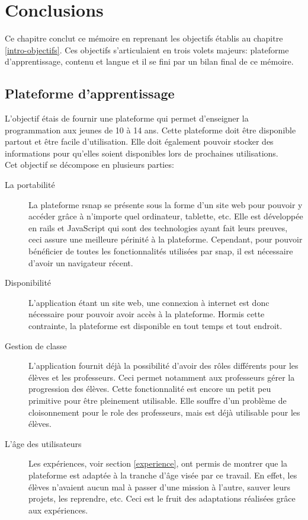 ﻿\chapter{Conclusions}
Ce chapitre conclut ce mémoire en reprenant les objectifs établis au chapitre \ref{intro-objectifs}. Ces objectifs s'articulaient en trois volets majeurs: plateforme d'apprentissage, contenu et langue et il se fini par un bilan final de ce mémoire.
\section{Plateforme d'apprentissage}
L'objectif étais de fournir une plateforme qui permet d'enseigner la programmation aux jeunes de 10 à 14 ans. Cette plateforme doit être disponible partout et être facile d'utilisation. Elle doit également pouvoir stocker des informations pour qu'elles soient disponibles lors de prochaines utilisations.\\

Cet objectif se décompose en plusieurs parties:
\begin{description}
  \item[La portabilité] La plateforme \gls{rsnap} se présente sous la forme d'un site web \cite{rsnap} pour pouvoir y accéder grâce à n'importe quel ordinateur, tablette, etc. Elle est développée en \gls{rails} et JavaScript qui sont des technologies ayant fait leurs preuves, ceci assure une meilleure périnité à la plateforme. Cependant, pour pouvoir bénéficier de toutes les fonctionnalités utilisées par \gls{snap}, il est nécessaire d'avoir un navigateur récent.

  \item[Disponibilité] L'application étant un site web, une connexion à internet est donc nécessaire pour pouvoir avoir accès à la plateforme. Hormis cette contrainte, la plateforme est disponible en tout temps et tout endroit.

  \item[Gestion de classe] L'application fournit déjà la possibilité d'avoir des rôles différents pour les élèves et les professeurs. Ceci permet notamment aux professeurs gérer la progression des élèves. Cette fonctionnalité est encore un petit peu primitive pour être pleinement utilisable. Elle souffre d'un problème de cloisonnement pour le \gls{role} des professeurs, mais est déjà utilisable pour les élèves.

  \item[L'âge des utilisateurs] Les expériences, voir section \ref{experience}, ont permis de montrer que la plateforme est adaptée à la tranche d'âge visée par ce travail. En effet, les élèves n'avaient aucun mal à passer d'une \gls{mission} à l'autre, sauver leurs projets, les reprendre, etc. Ceci est le fruit des adaptations réalisées grâce aux expériences.
\end{description}

